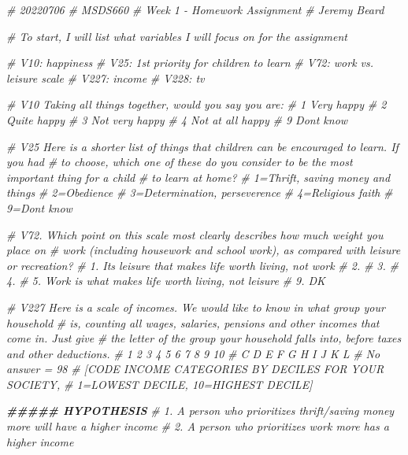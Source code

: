 \documentclass[
]{article}
\newenvironment{Shaded}{\begin{snugshade}}{\end{snugshade}}
\newcommand{\CommentTok}[1]{\textcolor[rgb]{0.56,0.35,0.01}{\textit{#1}}}
\newcommand{\DocumentationTok}[1]{\textcolor[rgb]{0.56,0.35,0.01}{\textbf{\textit{#1}}}}
\begin{document}
\begin{Shaded}
\begin{Highlighting}[]
\CommentTok{\# 20220706}
\CommentTok{\# MSDS660}
\CommentTok{\# Week 1 {-} Homework Assignment}
\CommentTok{\# Jeremy Beard}

\CommentTok{\# To start, I will list what variables I will focus on for the assignment}

\CommentTok{\# V10: happiness}
\CommentTok{\# V25: 1st priority for children to learn}
\CommentTok{\# V72: work vs. leisure scale}
\CommentTok{\# V227: income}
\CommentTok{\# V228: tv}

\CommentTok{\# V10 Taking all things together, would you say you are: }
\CommentTok{\# 1 Very happy }
\CommentTok{\# 2 Quite happy }
\CommentTok{\# 3 Not very happy }
\CommentTok{\# 4 Not at all happy }
\CommentTok{\# 9 Don\textquotesingle{}t know}

\CommentTok{\# V25 Here is a shorter list of things that children can be encouraged to learn. If you had }
\CommentTok{\# to choose, which one of these do you consider to be the most important thing for a child }
\CommentTok{\# to learn at home?}
\CommentTok{\# 1=Thrift, saving money and things}
\CommentTok{\# 2=Obedience}
\CommentTok{\# 3=Determination, perseverence}
\CommentTok{\# 4=Religious faith}
\CommentTok{\# 9=Don\textquotesingle{}t know}

\CommentTok{\# V72. Which point on this scale most clearly describes how much weight you place on }
\CommentTok{\# work (including housework and school work), as compared with leisure or recreation? }
\CommentTok{\# 1. It\textquotesingle{}s leisure that makes life worth living, not work }
\CommentTok{\# 2. }
\CommentTok{\# 3. }
\CommentTok{\# 4. }
\CommentTok{\# 5. Work is what makes life worth living, not leisure }
\CommentTok{\# 9. DK }

\CommentTok{\# V227 Here is a scale of incomes. We would like to know in what group your household }
\CommentTok{\# is, counting all wages, salaries, pensions and other incomes that come in. Just give }
\CommentTok{\# the letter of the group your household falls into, before taxes and other deductions. }
\CommentTok{\# 1 2 3 4 5 6 7 8 9 10 }
\CommentTok{\# C D E F G H I J K L }
\CommentTok{\# No answer = 98}
\CommentTok{\# [CODE INCOME CATEGORIES BY DECILES FOR YOUR SOCIETY, }
\CommentTok{\# 1=LOWEST DECILE, 10=HIGHEST DECILE]}


\DocumentationTok{\#\#\#\#\# HYPOTHESIS}
\CommentTok{\# 1. A person who prioritizes thrift/saving money more will have a higher income}
\CommentTok{\# 2. A person who prioritizes work more has a higher income}


\end{Highlighting}
\end{Shaded}
\end{document}

